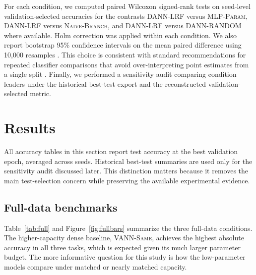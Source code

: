 \documentclass[preprint,12pt]{elsarticle}
\newcommand{\DANNLRF}{\textsc{DANN-LRF}}
\newcommand{\DANNRANDOM}{\textsc{DANN-RANDOM}}
\newcommand{\NAIVEBRANCH}{\textsc{Naive-Branch}}
\newcommand{\MLPPARAM}{\textsc{MLP-Param}}
\newcommand{\VANNSAME}{\textsc{VANN-Same}}
\begin{document}
For each condition, we computed paired Wilcoxon signed-rank tests \cite{wilcoxon1945individual} on seed-level validation-selected accuracies for the contrasts \DANNLRF{} versus \MLPPARAM{}, \DANNLRF{} versus \NAIVEBRANCH{}, and \DANNLRF{} versus \DANNRANDOM{} where available. Holm correction \cite{holm1979simple} was applied within each condition. We also report bootstrap 95\% confidence intervals on the mean paired difference using 10,000 resamples \cite{efron1994bootstrap}. This choice is consistent with standard recommendations for repeated classifier comparisons that avoid over-interpreting point estimates from a single split \cite{demsar2006statistical}. Finally, we performed a sensitivity audit comparing condition leaders under the historical best-test export and the reconstructed validation-selected metric.

\section{Results}
\label{sec:results}

All accuracy tables in this section report test accuracy at the best validation epoch, averaged across seeds. Historical best-test summaries are used only for the sensitivity audit discussed later. This distinction matters because it removes the main test-selection concern while preserving the available experimental evidence.

\subsection{Full-data benchmarks}
\label{sec:fullresults}

Table~\ref{tab:full} and Figure~\ref{fig:fullbars} summarize the three full-data conditions. The higher-capacity dense baseline, \VANNSAME{}, achieves the highest absolute accuracy in all three tasks, which is expected given its much larger parameter budget. The more informative question for this study is how the low-parameter models compare under matched or nearly matched capacity.
\end{document}
